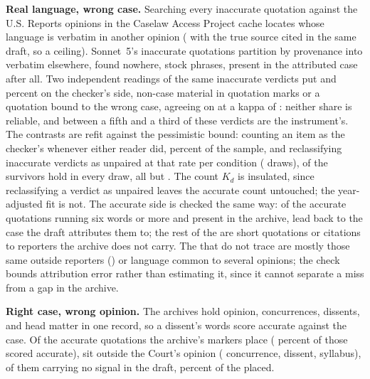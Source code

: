 \documentclass{IOS-Book-Article}
\begin{document}
\textbf{Real language, wrong case.} Searching every inaccurate quotation against the \provenanceCorpus{} U.S. Reports opinions in the Caselaw Access Project cache locates \misattrTotal{} whose language is verbatim in another opinion (\misattrSameDraft{} with the true source cited in the same draft, so a ceiling). Sonnet~5's \inaccTotalSonnet{} inaccurate quotations partition by provenance into \misattrSonnet{} verbatim elsewhere, \notInCorpusSonnet{} found nowhere, \genericMatchSonnet{} stock phrases, \falseAlarmSonnet{} present in the attributed case after all. Two independent readings of the same \twoRaterN{} inaccurate verdicts put \twoRaterOnePct{} and \twoRaterTwoPct{} percent on the checker's side, non-case material in quotation marks or a quotation bound to the wrong case, agreeing on \twoRaterBoth{} at a kappa of \twoRaterKappa: neither share is reliable, and between a fifth and a third of these verdicts are the instrument's. The contrasts are refit against the pessimistic bound: counting an item as the checker's whenever either reader did, \twoRaterUnionPct{} percent of the sample, and reclassifying inaccurate verdicts as unpaired at that rate per condition (\sensDraws{} draws), \sensUnionAlwaysKept{} of the \sensPrimaryN{} survivors hold in every draw, all but \sensUnionWeakName. The count $K_d$ is insulated, since reclassifying a verdict as unpaired leaves the accurate count untouched; the year-adjusted fit is not. The accurate side is checked the same way: of the \accProvChecked{} accurate quotations running six words or more and present in the archive, \accProvTraced{} lead back to the case the draft attributes them to; the rest of the \accProvTotal{} are short quotations or citations to reporters the archive does not carry. The \accProvUntraced{} that do not trace are mostly those same outside reporters (\accProvUntracedNonUs) or language common to several opinions; the check bounds attribution error rather than estimating it, since it cannot separate a miss from a gap in the archive. 

\textbf{Right case, wrong opinion.} The archives hold opinion, concurrences, dissents, and head matter in one record, so a dissent's words score accurate against the case. Of the \opLocated{} accurate quotations the archive's markers place (\opPlacedPct{} percent of those scored accurate), \opSeparate{} sit outside the Court's opinion (\opConcurrence{} concurrence, \opDissent{} dissent, \opHeadMatter{} syllabus), \opUnflagged{} of them carrying no signal in the draft, \opUnflaggedPct{} percent of the placed.
\end{document}
